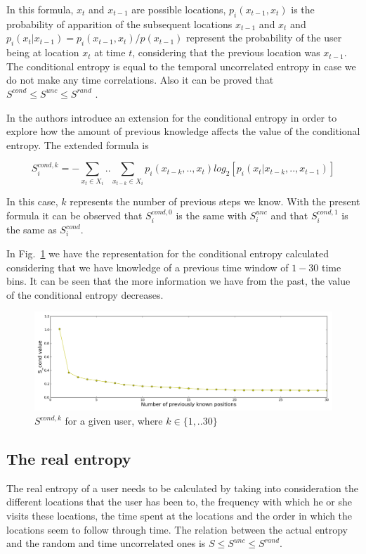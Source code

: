 In this formula, $x_{t}$ and $x_{t-1}$ are possible locations,
$p_{i}(x_{t-1},x_{t})$ is the probability of apparition of the subsequent
locations $x_{t-1}$ and $x_{t}$ and $p_{i}(x_{t}|x_{t-1}) = p_{i}(x_{t-1},x_{t})
/ p(x_{t-1})$ represent the probability of the user being at location $x_{t}$ at
time $t$, considering that the previous location was $x_{t-1}$. The conditional
entropy is equal to the temporal uncorrelated entropy in case we do not make any
time correlations. Also it can be proved that $S^{cond} \leq S^{unc} \leq
S^{rand}$ \cite{Cover:2006:EIT:1146355}.

In \cite{Sinatra14} the authors introduce an extension for the conditional
entropy in order to explore how the amount of previous knowledge affects the
value of the conditional entropy. The extended formula is 

\begin{equation}
S_{i}^{cond,k} = - \sum\limits_{x_{t}\in X_{i}} .. \sum\limits_{x_{t-k}\in
X_{i}} p_{i}(x_{t-k},..,x_{t})log_{2}[p_{i}(x_{t}|x_{t-k},..,x_{t-1})]
\end{equation}

In this case, $k$ represents the number of previous steps we know. With the
present formula it can be observed that $S_{i}^{cond,0}$ is the same with
$S_{i}^{unc}$ and that $S_{i}^{cond,1}$ is the same as $S_{i}^{cond}$.

In Fig.~\ref{conditional_e} we have the representation for the conditional
entropy calculated considering that we have knowledge of a previous time window
of $1 - 30$ time bins. It can be seen that the more information we have from the
past, the value of the conditional entropy decreases.

\begin{figure}[!h]
\centering
\includegraphics[width=\textwidth]{figures/entro_pred/constr.png}
\caption{$S^{cond,k}$ for a given user, where $ k \in \{1,..30\}$}
\label{conditional_e}
\end{figure}

\subsection{The real entropy}
The real entropy of a user needs to be calculated by taking into consideration
the different locations that the user has been to, the frequency with which he
or she visits these locations, the time spent at the locations and the order in
which the locations seem to follow through time. The relation between the actual
entropy and the random and time uncorrelated ones is $S \leq S^{unc}
\leq S^{rand}$. 

